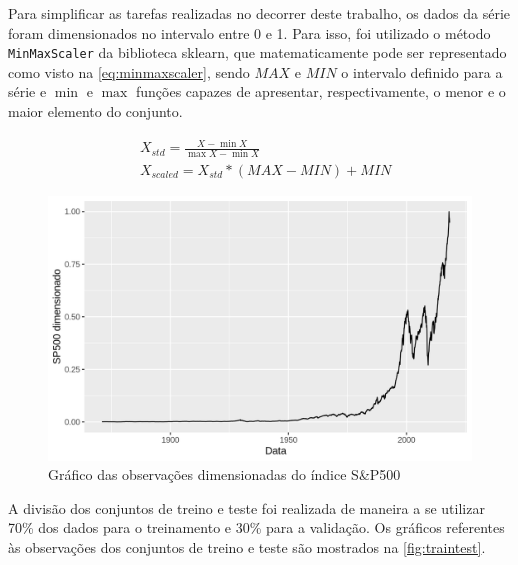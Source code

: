 \documentclass[
    12pt,
    oneside,
    a4paper,
    english,
    brazil
]{abntex2}
\begin{document}
Para simplificar as tarefas realizadas no  decorrer deste trabalho, os dados da
série foram dimensionados no intervalo entre 0  e 1. Para isso, foi utilizado o
método \texttt{MinMaxScaler}  da biblioteca  sklearn, que  matematicamente pode
ser representado como visto na \autoref{eq:minmaxscaler}, sendo $MAX$ e $MIN$ o
intervalo  definido  para  a série  e  $\min$  e $\max$ funções capazes de apresentar, respectivamente, o menor e o maior elemento do conjunto.

\begin{equation}
    \begin{split}\label{eq:minmaxscaler}
        &X_{std} = \frac{X - \min X}{\max X-\min X}\\
        &X_{scaled} = X_{std} * (MAX-MIN)+MIN
    \end{split}
\end{equation}

\begin{figure}[ht]
    \centering
    \caption{Gráfico das observações dimensionadas do índice S\&P500}\label{fig:sp500}
    \includegraphics[width=.5\linewidth]{images/SP500.png}
\end{figure}

A  divisão dos  conjuntos  de treino  e  teste  foi realizada  de  maneira a  se
utilizar 70\% dos  dados para o treinamento e 30\%  para a validação. Os gráficos referentes às observações dos conjuntos de treino e teste são mostrados na 
\autoref{fig:traintest}.
\end{document}
